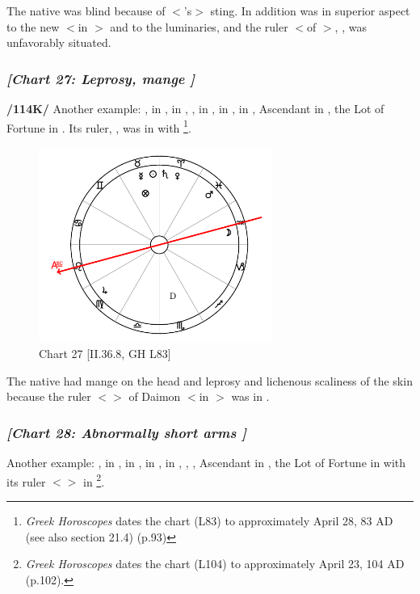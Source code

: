 The native was blind because of $<$\Scorpio’s$>$ sting. In
addition \Saturn\xspace was in superior aspect to the new \Moon\xspace $<$in \Scorpio$>$ and to the luminaries, and the ruler $<$of \Scorpio$>$, \Mars, was unfavorably situated.
\newpage

\subsubsection{\textit{[Chart 27: Leprosy, mange ]}}
\textbf{/114K/} Another example: \Sun, \Mercury\xspace in \Taurus, \Moon\xspace in \Aquarius, \Saturn, \Venus\xspace in \Aries, \Jupiter\xspace in \Virgo, \Mars\xspace in \Pisces, Ascendant in \Leo, the Lot of Fortune in \Taurus. Its ruler, \Venus, was in \Aries\xspace with \Saturn
\footnote{\textit{Greek Horoscopes} dates the chart (L83) to approximately April 28, 83 AD (see also section 21.4) (p.93)}. 

\clearpage
\begin{figure}
\centering
\vspace{-20pt}
\includegraphics[width=0.68\textwidth]{charts/2_36_8}
\caption{Chart 27 [II.36.8, GH L83]}
\label{fig:chart27}
\end{figure}

The native had mange on the head and leprosy and lichenous scaliness of the skin because the ruler $<$\Mars$>$ of Daimon $<$in \Scorpio$>$ was in \Pisces.

\newpage
\subsubsection{\textit{[Chart 28: Abnormally short arms ]}}
Another example: \Sun, \Mars\xspace in \Taurus, \Moon\xspace in \Virgo, \Saturn\xspace in \Sagittarius, \Jupiter\xspace in \Gemini, \Mercury, \Venus, Ascendant in \Aries, the Lot of Fortune in \Sagittarius with its ruler $<$\Jupiter$>$ in \Gemini
\footnote{\textit{Greek Horoscopes} dates the chart (L104) to approximately April 23, 104 AD (p.102).}.

